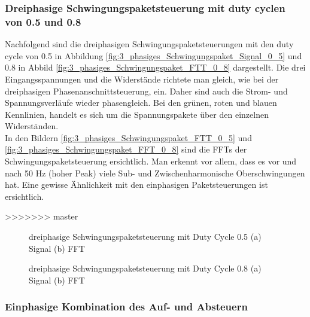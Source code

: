\subsubsection{Dreiphasige Schwingungspaketsteuerung mit duty cyclen von 0.5 und 0.8}\label{sec:Schwingungspaketsteuerung_Simulation}
Nachfolgend sind die dreiphasigen Schwingungspaketsteuerungen mit den duty cycle von 0.5 in Abbildung \ref{fig:3_phasiges_Schwingungspaket_Signal_0_5} und 0.8 in Abbild \ref{fig:3_phasiges_Schwingungspaket_FTT_0_8} dargestellt. Die drei Eingangsspannungen und die Widerstände richtete man gleich, wie bei der dreiphasigen Phasenanschnittsteuerung, ein. Daher sind auch die Strom- und Spannungsverläufe wieder phasengleich. Bei den grünen, roten und blauen Kennlinien, handelt es sich um die Spannungspakete über den einzelnen Widerständen.\\
In den Bildern \ref{fig:3_phasiges_Schwingungspaket_FTT_0_5} und \ref{fig:3_phasiges_Schwingungspaket_FFT_0_8} sind die FFTs der Schwingungspaketsteuerung ersichtlich. Man erkennt vor allem, dass es vor und nach 50 Hz (hoher Peak) viele Sub- und Zwischenharmonische Oberschwingungen hat. Eine gewisse Ähnlichkeit mit den einphasigen Paketsteuerungen ist ersichtlich.
 
>>>>>>> master

\begin{figure}[ht!]
	\centering
	\qquad
	\caption{dreiphasige Schwingungspaketsteuerung mit Duty Cycle 0.5 (a) Signal (b) FFT}
	\label{fig:3_phasiges_Schwingungspaket_0_5}
\end{figure}



\begin{figure}[ht!]
	\centering
	\qquad
	\caption{dreiphasige Schwingungspaketsteuerung mit Duty Cycle 0.8 (a) Signal (b) FFT}
	\label{fig:3_phasiges_Schwingungspaket_0_8}
\end{figure}

\newpage
\subsubsection{Einphasige Kombination des Auf- und Absteuern}

